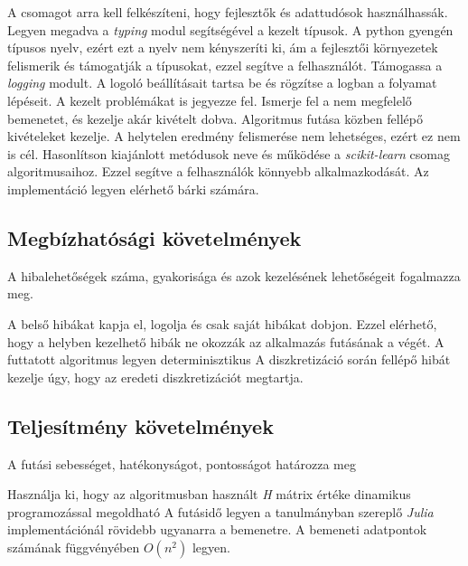 \begin{enumerate}[resume]
     A csomagot arra kell felkészíteni, hogy fejlesztők és adattudósok használhassák.
     Legyen megadva a \textit{typing} modul segítségével a kezelt típusok. A python gyengén típusos nyelv, ezért ezt a nyelv nem kényszeríti ki, ám a fejlesztői környezetek felismerik és támogatják a típusokat, ezzel segítve a felhasználót.
     Támogassa a \textit{logging} modult. A logoló beállításait tartsa be és rögzítse a logban a folyamat lépéseit. A kezelt problémákat is jegyezze fel.
     Ismerje fel a nem megfelelő bemenetet, és kezelje akár kivételt dobva.
     Algoritmus futása közben fellépő kivételeket kezelje. A helytelen eredmény felismerése nem lehetséges, ezért ez nem is cél.
     Hasonlítson kiajánlott metódusok neve és működése a \textit{scikit-learn} csomag algoritmusaihoz. Ezzel segítve a felhasználók könnyebb alkalmazkodását.
     Az implementáció legyen elérhető bárki számára.
\end{enumerate}

\subsection{Megbízhatósági követelmények}
A hibalehetőségek száma, gyakorisága és azok kezelésének lehetőségeit fogalmazza meg.

\begin{enumerate}[resume]
     A belső hibákat kapja el, logolja és csak saját hibákat dobjon. Ezzel elérhető, hogy a helyben kezelhető hibák ne okozzák az alkalmazás futásának a végét.
     A futtatott algoritmus legyen determinisztikus
     A diszkretizáció során fellépő hibát kezelje úgy, hogy az eredeti diszkretizációt megtartja.
\end{enumerate}

\subsection{Teljesítmény követelmények}
A futási sebességet, hatékonyságot, pontosságot határozza meg

\begin{enumerate}[resume]
     Használja ki, hogy az algoritmusban használt \textit{H} mátrix értéke dinamikus programozással megoldható
     A futásidő legyen a tanulmányban szereplő \textit{Julia} implementációnál rövidebb ugyanarra a bemenetre.
     A bemeneti adatpontok számának függvényében $O(n^2)$ legyen.
\end{enumerate}

